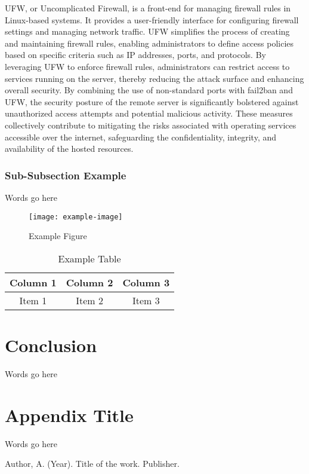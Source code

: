 \documentclass[12pt]{article}
\begin{document}
\newline
\newline
\noindent UFW, or Uncomplicated Firewall, is a front-end for managing firewall rules in Linux-based systems. It provides a user-friendly interface for configuring firewall settings and managing network traffic. UFW simplifies the process of creating and maintaining firewall rules, enabling administrators to define access policies based on specific criteria such as IP addresses, ports, and protocols. By leveraging UFW to enforce firewall rules, administrators can restrict access to services running on the server, thereby reducing the attack surface and enhancing overall security.
\newline
\newline
\noindent By combining the use of non-standard ports with fail2ban and UFW, the security posture of the remote server is significantly bolstered against unauthorized access attempts and potential malicious activity. These measures collectively contribute to mitigating the risks associated with operating services accessible over the internet, safeguarding the confidentiality, integrity, and availability of the hosted resources.
\newline
\newline
\subsubsection{Sub-Subsection Example}
\noindent Words go here

\begin{figure}[H]
    \centering
    \texttt{[image: example-image]}
    \caption{Example Figure}
    \label{fig:example}
\end{figure}

\begin{table}[H]
    \centering
    \begin{tabular}{|c|c|c|}
        \hline
        Column 1 & Column 2 & Column 3 \\
        \hline
        Item 1 & Item 2 & Item 3 \\
        \hline
    \end{tabular}
    \caption{Example Table}
    \label{tab:example}
\end{table}

\section{Conclusion}
\noindent Words go here

\appendix
\section{Appendix Title}
\noindent Words go here

\begin{thebibliography}{99}
 Author, A. (Year). Title of the work. Publisher.
\end{thebibliography}
\end{document}
